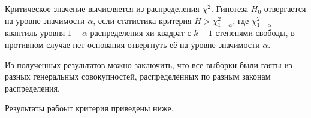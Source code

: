 Критическое значение вычисляется из распределения $\chi^2$. Гипотеза $H_0$ отвергается на уровне значимости $\alpha$, если статистика критерия $H > \chi^2_{1 = \alpha}$, где $\chi^2_{1 = \alpha}$ -- квантиль уровня $1 - \alpha$ распределения хи-квадрат с $k - 1$ степенями свободы, в противном случае нет основания отвергнуть её на уровне значимости $\alpha$.

Из полученных результатов можно заключить, что все выборки были взяты из разных генеральных совокупностей, распределённых по разным законам распределения.

Результаты рабоыт критерия приведены ниже.

